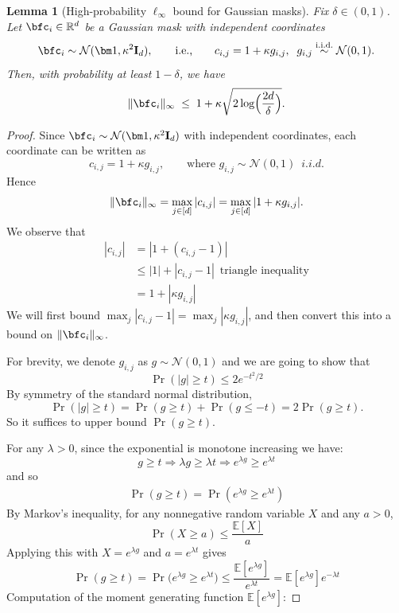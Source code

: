 \documentclass[10pt]{article} %
\newtheorem{lemma}[theorem]{Lemma}
\theoremstyle{definition}
\theoremstyle{plain}
\def\bfI{{\mathbf{I}}}\def\bfJ{{\mathbf{J}}}\def\bfK{{\mathbf{K}}}\def\bfL{{\mathbf{L}}}
\begin{document}
\begin{lemma}[High-probability $\ell_\infty$ bound for Gaussian masks]
\label{lem:c_infty_bound}
Fix $\delta\in(0,1)$. Let $\bfc_i\in\mathbb R^d$ be a Gaussian mask with independent coordinates
\[
\bfc_i \sim \mathcal N(\bm 1,\kappa^2 \bfI_d),
\qquad\text{i.e.,}\qquad
c_{i,j} = 1+\kappa g_{i,j},\;\; g_{i,j}\stackrel{\text{i.i.d.}}{\sim}\mathcal N(0,1).
\]
Then, with probability at least $1-\delta$, we have
\[
\|\bfc_i\|_\infty \;\le\; 1 + \kappa\sqrt{2\log\!\Big(\frac{2d}{\delta}\Big)}.
\]
\end{lemma}

\begin{proof}
Since $\bfc_i\sim\mathcal N(\bm 1,\kappa^2\bfI_d)$ with independent coordinates, each coordinate can be written as
\[
c_{i,j} = 1+ \kappa g_{i,j},
\qquad\text{where } g_{i,j}\sim\mathcal N(0,1) \enspace i.i.d.
\]
Hence
\[
\|\bfc_i\|_\infty = \max_{j\in[d]}|c_{i,j}| = \max_{j\in[d]}|1+\kappa g_{i,j}|.
\]
We observe that 
\begin{align*}
|c_{i,j}|
&=|1+(c_{i,j}-1)| \\
&\le |1|+|c_{i,j}-1| \enspace \text{triangle inequality} \\
&= 1+|\kappa g_{i,j}| 
\end{align*}
We will first bound $\max_j |c_{i,j}-1| = \max_j |\kappa g_{i,j}|$, and then convert this into a bound on $\|\bfc_i\|_\infty$.

For brevity, we denote $g_{i,j}$ as $g\sim\mathcal N(0,1)$ and we are going to show that
\begin{equation}
\label{eq:gauss_tail}
\boxed{\Pr(|g|\ge t)\le 2e^{-t^2/2}}
\end{equation}
By symmetry of the standard normal distribution,
\[
\Pr(|g|\ge t)=\Pr(g\ge t)+\Pr(g\le -t)=2\Pr(g\ge t).
\]
So it suffices to upper bound $\Pr(g\ge t)$.

For any $\lambda>0$, since the exponential is monotone increasing we have:
\[
g\ge t \Rightarrow  \lambda g \ge \lambda t  \Rightarrow e^{\lambda g}\ge e^{\lambda t}
\]
and so 
\begin{align*}
    \Pr(g\ge t) = \Pr(e^{\lambda g}\ge e^{\lambda t})
\end{align*}
By Markov's inequality, for any nonnegative random variable $X$ and any $a>0$,
\[
\Pr(X\ge a)\le \frac{ \mathbb E[X]}{a}
\]
Applying this with $X=e^{\lambda g}$ and $a=e^{\lambda t}$ gives
\begin{equation}
\label{eq:markov_step}
\Pr(g\ge t)=\Pr\big(e^{\lambda g}\ge e^{\lambda t}\big)
\le \frac{\mathbb E[e^{\lambda g}]}{e^{\lambda t}}
= \mathbb E[e^{\lambda g}]e^{-\lambda t}
\end{equation}
Computation of the moment generating function $\mathbb E[e^{\lambda g}]$:


\end{proof}
\end{document}
